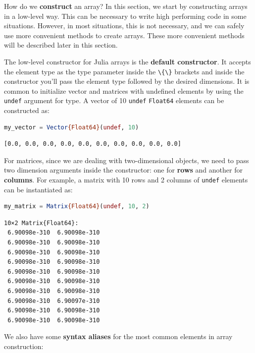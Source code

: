 \documentclass[
  notoc %
]{tufte-book}
\newcommand{\passthrough}[1]{#1}
\begin{document}
How do we \textbf{construct} an array? In this section, we start by
constructing arrays in a low-level way. This can be necessary to write
high performing code in some situations. However, in most situations,
this is not necessary, and we can safely use more convenient methods to
create arrays. These more convenient methods will be described later in
this section.

The low-level constructor for Julia arrays is the \textbf{default
constructor}. It accepts the element type as the type parameter inside
the \passthrough{\lstinline!\{\}!} brackets and inside the constructor
you'll pass the element type followed by the desired dimensions. It is
common to initialize vector and matrices with undefined elements by
using the \passthrough{\lstinline!undef!} argument for type. A vector of
10 \passthrough{\lstinline!undef!} \passthrough{\lstinline!Float64!}
elements can be constructed as:

\begin{lstlisting}[language=Julia]
my_vector = Vector{Float64}(undef, 10)
\end{lstlisting}

\begin{lstlisting}[language=Output]
[0.0, 0.0, 0.0, 0.0, 0.0, 0.0, 0.0, 0.0, 0.0, 0.0]
\end{lstlisting}

For matrices, since we are dealing with two-dimensional objects, we need
to pass two dimension arguments inside the constructor: one for
\textbf{rows} and another for \textbf{columns}. For example, a matrix
with 10 rows and 2 columns of \passthrough{\lstinline!undef!} elements
can be instantiated as:

\begin{lstlisting}[language=Julia]
my_matrix = Matrix{Float64}(undef, 10, 2)
\end{lstlisting}

\begin{lstlisting}[language=Output]
10×2 Matrix{Float64}:
 6.90098e-310  6.90098e-310
 6.90098e-310  6.90098e-310
 6.90098e-310  6.90098e-310
 6.90098e-310  6.90098e-310
 6.90098e-310  6.90098e-310
 6.90098e-310  6.90098e-310
 6.90098e-310  6.90098e-310
 6.90098e-310  6.90097e-310
 6.90098e-310  6.90098e-310
 6.90098e-310  6.90098e-310
\end{lstlisting}

We also have some \textbf{syntax aliases} for the most common elements
in array construction:
\end{document}
